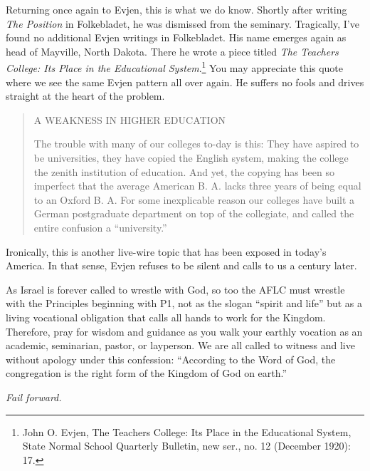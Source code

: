 Returning once again to Evjen, this is what we do know. Shortly after writing \textit{The Position} in Folkebladet, he was dismissed from the seminary. Tragically, I've found no additional Evjen writings in Folkebladet. His name emerges again as head of Mayville, North Dakota. There he wrote a piece titled \textit{The Teachers College: Its Place in the Educational System}.\footnote{John O. Evjen, The Teachers College: Its Place in the Educational System, State Normal School Quarterly Bulletin, new ser., no. 12 (December 1920): 17.} You may appreciate this quote where we see the same Evjen pattern all over again. He suffers no fools and drives straight at the heart of the problem. %


\begin{quote}
A WEAKNESS IN HIGHER EDUCATION

The trouble with many of our colleges to-day is this: They have aspired to be universities, they have copied the English system, making the college the zenith institution of education. And yet, the copying has been so imperfect that the average American B. A. lacks three years of being equal to an Oxford B. A. For some inexplicable reason our colleges have built a German postgraduate department on top of the collegiate,
and called the entire confusion a ``university.''
\end{quote}

Ironically, this is another live-wire topic that has been exposed in today's America. In that sense, Evjen refuses to be silent and calls to us a century later.   

As Israel is forever called to wrestle with God, so too the AFLC must wrestle with the Principles beginning with P1, not as the slogan ``spirit and life'' but as a living vocational obligation that calls all hands to work for the Kingdom. Therefore, pray for wisdom and guidance as you walk your earthly vocation as an academic, seminarian, pastor, or layperson. We are all called to witness and live without apology under this confession: ``According to the Word of God, the congregation is the right form of the Kingdom of God on earth.''

\textit{Fail forward.}



